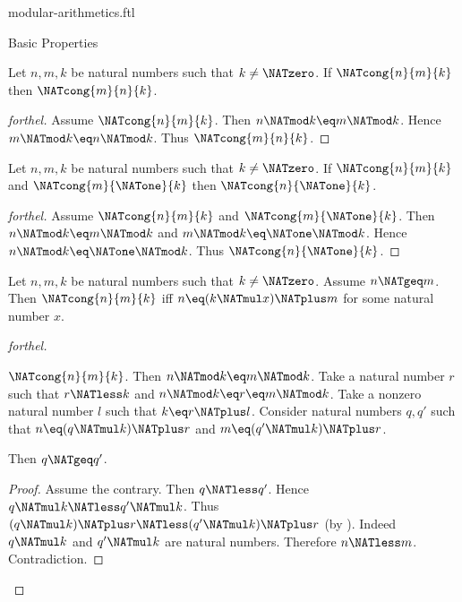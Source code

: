 \documentclass{naproche-library}
\begin{document}
\begin{smodule}[title=Modular Arithmetics]{modular-arithmetics.ftl}
\begin{sfragment}{Basic Properties}
  \begin{proposition}[forthel,id=ARITHMETIC_08_2337210737098752]
    Let $n, m, k$ be natural numbers such that $k \neq \NATzero$.
    If $\NATcong{n}{m}{k}$ then $\NATcong{m}{n}{k}$.
  \end{proposition}
  \begin{proof}[forthel]
    Assume $\NATcong{n}{m}{k}$.
    Then $n \NATmod k \eq m \NATmod k$.
    Hence $m \NATmod k \eq n \NATmod k$.
    Thus $\NATcong{m}{n}{k}$.
  \end{proof}

  \begin{proposition}[forthel,id=ARITHMETIC_08_7464329746055168]
    Let $n, m, k$ be natural numbers such that $k \neq \NATzero$.
    If $\NATcong{n}{m}{k}$ and $\NATcong{m}{\NATone}{k}$ then $\NATcong{n}{\NATone}{k}$.
  \end{proposition}
  \begin{proof}[forthel]
    Assume $\NATcong{n}{m}{k}$ and $\NATcong{m}{\NATone}{k}$.
    Then $n \NATmod k \eq m \NATmod k$ and $m \NATmod k \eq \NATone \NATmod k$.
    Hence $n \NATmod k \eq \NATone \NATmod k$.
    Thus $\NATcong{n}{\NATone}{k}$.
  \end{proof}

  \begin{proposition}[forthel,id=ARITHMETIC_08_2034122983735296]
    Let $n, m, k$ be natural numbers such that $k \neq \NATzero$.
    Assume $n \NATgeq m$.
    Then $\NATcong{n}{m}{k}$ iff $n \eq (k \NATmul x) \NATplus m$ for some natural number $x$.
  \end{proposition}
  \begin{proof}[forthel]
    \begin{case}{$\NATcong{n}{m}{k}$.}
      Then $n \NATmod k \eq m \NATmod k$.
      Take a natural number $r$ such that $r \NATless k$ and $n \NATmod k \eq r \eq m \NATmod k$.
      Take a nonzero natural number $l$ such that $k \eq r \NATplus l$.
      Consider natural numbers $q,q'$ such that $n \eq (q \NATmul k) \NATplus r$ and $m \eq (q' \NATmul k) \NATplus r$.

      Then $q \NATgeq q'$.
      \begin{proof}
        Assume the contrary.
        Then $q \NATless q'$.
        Hence $q \NATmul k \NATless q' \NATmul k$.
        Thus $(q \NATmul k) \NATplus r \NATless (q' \NATmul k) \NATplus r$ (by ).
        Indeed $q \NATmul k$ and $q' \NATmul k$ are natural numbers.
        Therefore $n \NATless m$.
        Contradiction.
      \end{proof}


\end{case}
\end{proof}
\end{sfragment}
\end{smodule}
\end{document}
